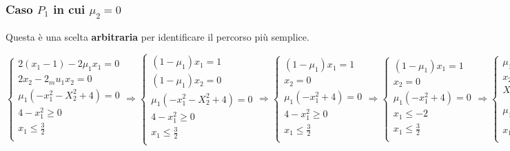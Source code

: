 \documentclass[\main/main.tex]{subfiles}
\begin{document}
\subsubsection{Caso $P_1$ in cui $\mu_2 = 0$}
Questa è una scelta \textbf{arbitraria} per identificare il percorso più semplice.

\[
	\begin{cases}
		2(x_1-1) - 2\mu_1 x_1 = 0     \\
		2x_2 - 2_mu_1 x_2 = 0         \\
		\mu_1 (-x_1^2 - X_2^2 + 4)= 0 \\
		4-x_1^2 \geq 0                \\
		x_1 \leq \frac{3}{2}          \\
	\end{cases}
	\Rightarrow
	\begin{cases}
		(1-\mu_1)x_1 = 1              \\
		(1-\mu_1)x_2=0                \\
		\mu_1 (-x_1^2 - X_2^2 + 4)= 0 \\
		4-x_1^2 \geq 0                \\
		x_1 \leq \frac{3}{2}          \\
	\end{cases}
	\Rightarrow
	\begin{cases}
		(1-\mu_1)x_1 = 1      \\
		x_2=0                 \\
		\mu_1 (-x_1^2 + 4)= 0 \\
		4-x_1^2 \geq 0        \\
		x_1 \leq \frac{3}{2}  \\
	\end{cases}
	\Rightarrow
	\begin{cases}
		(1-\mu_1)x_1 = 1      \\
		x_2=0                 \\
		\mu_1 (-x_1^2 + 4)= 0 \\
		x_1 \leq -2           \\
		x_1 \leq \frac{3}{2}  \\
	\end{cases}
	\Rightarrow
	\begin{cases}
		\mu_1 > 0            \\
		x_2=0                \\
		X_1 = -2             \\
		\mu_1 = \dfrac{2}{2} \\
		x_1 \leq \frac{3}{2} \\
	\end{cases}
\]
\end{document}
